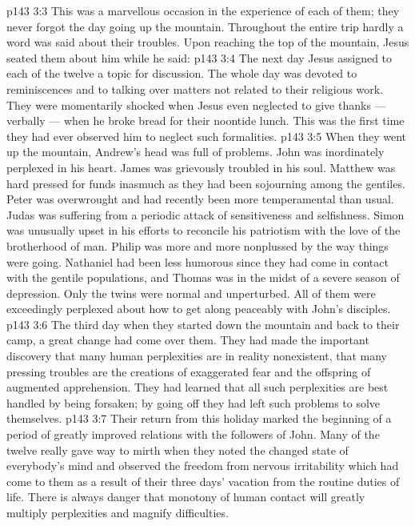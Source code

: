 \vs p143 3:3 \pc This was a marvellous occasion in the experience of each of them; they never forgot the day going up the mountain. Throughout the entire trip hardly a word was said about their troubles. Upon reaching the top of the mountain, Jesus seated them about him while he said: 
\vs p143 3:4 The next day Jesus assigned to each of the twelve a topic for discussion. The whole day was devoted to reminiscences and to talking over matters not related to their religious work. They were momentarily shocked when Jesus even neglected to give thanks --- verbally --- when he broke bread for their noontide lunch. This was the first time they had ever observed him to neglect such formalities.
\vs p143 3:5 When they went up the mountain, Andrew’s head was full of problems. John was inordinately perplexed in his heart. James was grievously troubled in his soul. Matthew was hard pressed for funds inasmuch as they had been sojourning among the gentiles. Peter was overwrought and had recently been more temperamental than usual. Judas was suffering from a periodic attack of sensitiveness and selfishness. Simon was unusually upset in his efforts to reconcile his patriotism with the love of the brotherhood of man. Philip was more and more nonplussed by the way things were going. Nathaniel had been less humorous since they had come in contact with the gentile populations, and Thomas was in the midst of a severe season of depression. Only the twins were normal and unperturbed. All of them were exceedingly perplexed about how to get along peaceably with John’s disciples.
\vs p143 3:6 The third day when they started down the mountain and back to their camp, a great change had come over them. They had made the important discovery that many human perplexities are in reality nonexistent, that many pressing troubles are the creations of exaggerated fear and the offspring of augmented apprehension. They had learned that all such perplexities are best handled by being forsaken; by going off they had left such problems to solve themselves.
\vs p143 3:7 Their return from this holiday marked the beginning of a period of greatly improved relations with the followers of John. Many of the twelve really gave way to mirth when they noted the changed state of everybody’s mind and observed the freedom from nervous irritability which had come to them as a result of their three days’ vacation from the routine duties of life. There is always danger that monotony of human contact will greatly multiply perplexities and magnify difficulties.
